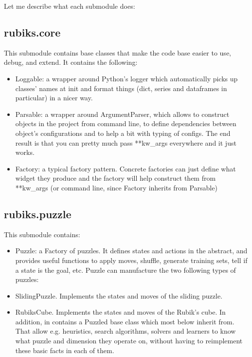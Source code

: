 Let me describe what each submodule does:

\subsection{rubiks.core}
This submodule contains base classes that make the code base easier to use, debug, and extend. It contains the following:
\begin{itemize}
\item Loggable: a wrapper around Python's logger which automatically picks up classes' names at init and format things (dict, series and dataframes in particular) in a nicer way.
\item Parsable: a wrapper around ArgumentParser, which allows to construct objects in the project from command line, to define dependencies between object's configurations and to help a bit with typing of configs. The end result is that you can pretty much pass **kw\_args everywhere and it just works.
\item Factory: a typical factory pattern. Concrete factories can just define what widget they produce and the factory will help construct them from **kw\_args (or command line, since Factory inherits from Parsable)
\end{itemize}

\subsection{rubiks.puzzle}
This submodule contains:
\begin{itemize}
\item Puzzle: a Factory of puzzles. It defines states and actions in the abstract, and provides useful functions to apply moves, shuffle, generate training sets, tell if a state is the goal, etc. Puzzle can manufacture the two following types of puzzles:
\item SlidingPuzzle. Implements the states and moves of the sliding puzzle.
\item RubiksCube. Implements the states and moves of the Rubik's cube.
In addition, in contains a Puzzled base class which most below inherit from. That allow e.g. heuristics, search algorithms, solvers and learners to know what puzzle and dimension they operate on, without having to reimplement these basic facts in each of them.
\end{itemize}

